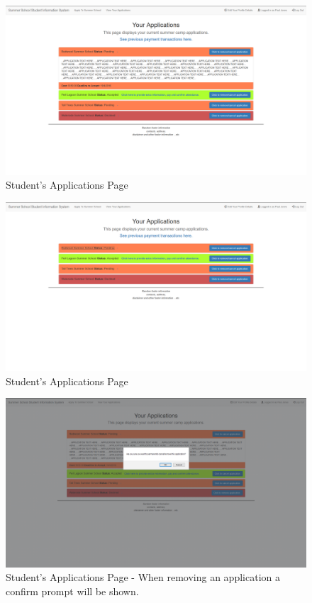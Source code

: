\documentclass{project}
\begin{document}
\begin{figure}[h]
\includegraphics[width=\linewidth]{student-app2.png}
\caption{Student's Applications Page}
\label{fig:students-applications2}
\end{figure}
\begin{figure}[h]
\includegraphics[width=\linewidth]{student-app3.png}
\caption{Student's Applications Page}
\label{fig:students-applications3}
\end{figure}
\begin{figure}[h]
\includegraphics[width=\linewidth]{student-app-remove.png}
\caption{Student's Applications Page - When removing an application a confirm prompt will be shown.}
\label{fig:students-applications-remove}
\end{figure}
\end{document}
